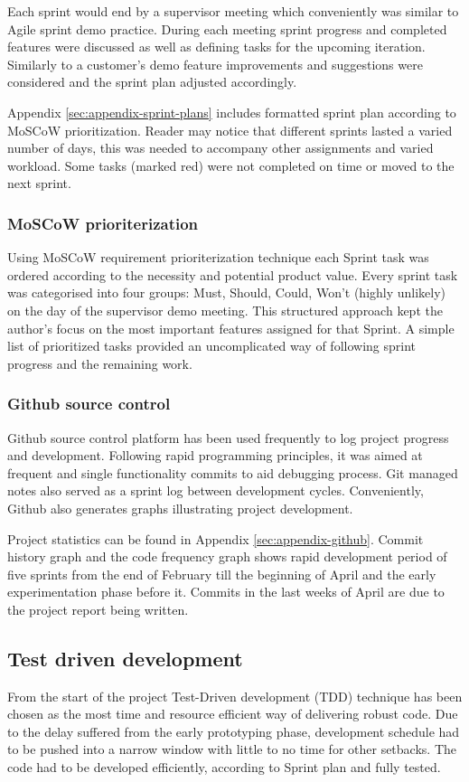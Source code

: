 		Each sprint would end by a supervisor meeting which conveniently was similar to Agile sprint demo practice. During each meeting sprint progress and completed features were discussed as well as defining tasks for the upcoming iteration. Similarly to a customer’s demo feature improvements and suggestions were considered and the sprint plan adjusted accordingly.
		
		Appendix \ref{sec:appendix-sprint-plans} includes formatted sprint plan according to MoSCoW prioritization. Reader may notice that different sprints lasted a varied number of days, this was needed to accompany other assignments and varied workload. Some tasks (marked red) were not completed on time or moved to the next sprint.
	
		\subsubsection{MoSCoW prioriterization}
		Using MoSCoW requirement prioriterization technique each Sprint task was ordered according to the necessity and potential product value. Every sprint task was categorised into four groups: Must, Should, Could, Won't (highly unlikely) on the day of the supervisor demo meeting. This structured approach kept the author's focus on the most important features assigned for that Sprint. A simple list of prioritized tasks provided an uncomplicated way of following sprint progress and the remaining work.  
		
		\subsubsection{Github source control}
		Github source control platform has been used frequently to log project progress and development. Following rapid programming principles, it was aimed at frequent and single functionality commits to aid debugging process. Git managed notes also served as a sprint log between development cycles. Conveniently, Github also generates graphs illustrating project development. 
		
		Project statistics can be found in Appendix \ref{sec:appendix-github}. Commit history graph and the code frequency graph shows rapid development period of five sprints from the end of February till the beginning of April and the early experimentation phase before it. Commits in the last weeks of April are due to the project report being written.
		
		
	\subsection{Test driven development}
		From the start of the project Test-Driven development (TDD) technique has been chosen as the most time and resource efficient way of delivering robust code. Due to the delay suffered from the early prototyping phase, development schedule had to be pushed into a narrow window with little to no time for other setbacks. The code had to be developed efficiently, according to Sprint plan and fully tested. 
		
